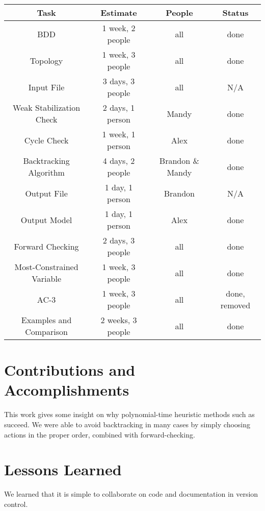 \begin{center}
\begin{tabular}{|c||c|c|c|}
\hline
 Task & Estimate & People & Status \\
\hline
 BDD & 1 week, 2 people & all & done \\
 Topology & 1 week, 3 people & all & done \\
 Input File & 3 days, 3 people & all & N/A \\
 Weak Stabilization Check & 2 days, 1 person & Mandy & done \\
 Cycle Check & 1 week, 1 person & Alex & done \\
 Backtracking Algorithm & 4 days, 2 people & Brandon \& Mandy & done \\
 Output File & 1 day, 1 person &  Brandon & N/A \\
 Output Model & 1 day, 1 person & Alex & done \\
 Forward Checking & 2 days, 3 people & all & done \\
 Most-Constrained Variable & 1 week, 3 people & all & done \\
 AC-3 & 1 week, 3 people & all & done, removed \\
 Examples and Comparison & 2 weeks, 3 people & all & done \\
\hline
\end{tabular}
\end{center}

\section{Contributions and Accomplishments}

This work gives some insight on why polynomial-time heuristic methods such as \cite{ipdpsEbnenasir11} succeed.
We were able to avoid backtracking in many cases by simply choosing actions in the proper order, combined with forward-checking.

\section{Lessons Learned}

We learned that it is simple to collaborate on code and documentation in version control.

